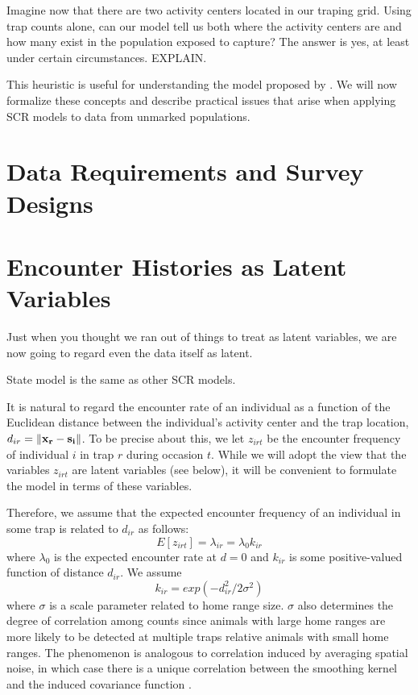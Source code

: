 Imagine now that there are two activity centers located in our traping
grid. Using trap counts alone, can our model tell us both where the
activity centers are and how many exist in the population exposed to
capture? The answer is yes, at least under certain circumstances.
EXPLAIN.

This heuristic is useful for understanding the model proposed by
\citet{chandler_royle:2012}. We will now formalize these concepts and
describe practical issues that arise when applying SCR
models to data from unmarked populations.



\section{Data Requirements and Survey Designs}






\section{Encounter Histories as Latent Variables}

Just when you thought we ran out of things to treat as latent
variables, we are now going to regard even the data itself as latent.


State model is the same as other SCR models.


It is natural to regard the encounter rate of an individual
as a function of the Euclidean distance between the individual's
activity center and the trap location, $d_{ir} = \| {\bf x_r} - {\bf
  s_i} \|$.
To be precise about this, we let $z_{irt}$ be the encounter frequency
of
individual $i$ in trap $r$ during occasion $t$. While we will adopt the view
that  the variables $z_{irt}$ are latent variables (see below), it will
be convenient to formulate the model in terms of these variables.

Therefore, we assume that the expected encounter frequency of an
individual in some trap is related to $d_{ir}$ as follows:
\[
E[z_{irt}] = \lambda_{ir} = \lambda_0 k_{ir}
\]
where $\lambda_0$ is the expected encounter rate at $d=0$ and $k_{ir}$
is some positive-valued
function of distance $d_{ir}$. We assume
\[
k_{ir} = exp(-d_{ir}^2 / 2\sigma^2)
\]
where $\sigma$ is a scale parameter related to home
range size. $\sigma$ also determines the degree of correlation among
counts since animals with large home ranges are more likely to be
detected at multiple traps relative animals with small home ranges.
The phenomenon is analogous to correlation induced by averaging
spatial noise, in which case there is a unique correlation between the
smoothing kernel and the induced covariance function
\citep{higdon:2002}.

